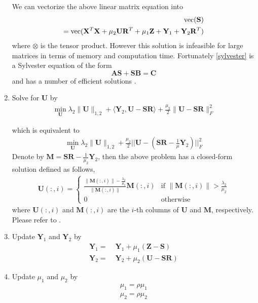 \documentclass{article}
\begin{document}
\begin{enumerate}
We can vectorize the above linear matrix equation into
\begin{align*}
 [I\otimes (\mathbf X^T\mathbf X + \mu_1 I) + \mu_2\mathbf R\mathbf R^T\otimes I]\textrm{vec}(\mathbf S) \notag\\
 = \textrm{vec}(\mathbf X^T\mathbf X+ \mu_2 \mathbf U\mathbf R^T + \mu_1 \mathbf Z + \mathbf Y_1 + \mathbf Y_2\mathbf R^T)
\end{align*}
where $\otimes$ is the tensor product. However this solution is infeasible for large matrices in terms of memory and computation time. Fortunately \eqref{sylvester} is a Sylvester equation of the form
\[
\mathbf{A S + S B = C}
\]
and has a number of efficient solutions \cite{penzl1998numerical, golub1979hessenberg}.

\item Solve for $\mathbf U$ by
\begin{align*}
 \min_{\mathbf U} \lambda_2\|\mathbf U\|_{1,2} + \langle \mathbf Y_2, \mathbf U - \mathbf S\mathbf R\rangle +\frac{\mu_2}2\|\mathbf U - \mathbf S\mathbf R\|^2_F
\end{align*}

which is equivalent to
\begin{align*}
 \min_{\mathbf U} \lambda_2\|\mathbf U\|_{1,2} + \frac{\mu_2}{2}|| \mathbf U - (\mathbf S \mathbf R - \frac{1}{\mu} \mathbf Y_2)||^2_F
\end{align*}
Denote by $\mathbf M = \mathbf S \mathbf R - \frac{1}{\mu_2} \mathbf Y_2$, then the above problem has a closed-form solution defined as follows, 
\begin{align}
\label{SolutionU_relaxed}
\mathbf U(:,i) = \begin{cases} \frac{\|\mathbf M(:,i)\| - \frac{\lambda_2}{\mu_2}}{\|\mathbf M(:,i)\|}\mathbf M(:,i) & \textrm{if } \|\mathbf M(:,i)\| > \frac{\lambda_2}{\mu_2} \\
0 & \textrm{otherwise}
\end{cases}
\end{align}
where $\mathbf U(:,i)$ and $\mathbf M(:,i)$ are the $i$-th columns of $\mathbf U$ and $\mathbf M$, respectively. Please refer to \cite{liu2010robust}.

\item Update $\mathbf Y_1$ and $\mathbf Y_2$ by
\begin{align*}
\mathbf Y_1 =& \; \mathbf Y_1 + \mu_1 (\mathbf Z - \mathbf S) \\
\mathbf Y_2 =& \; \mathbf Y_2 + \mu_2 (\mathbf U - \mathbf S \mathbf R)
\end{align*}

\item Update $\mu_1$ and $\mu_2$ by
\begin{align*}
 \mu_1 = \rho \mu_1\\
 \mu_2 = \rho \mu_2
\end{align*}

\end{enumerate}

\newpage


\end{document}
